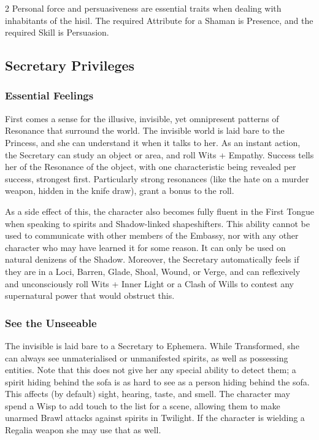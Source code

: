 \begin{multicols}{2}
Personal force and persuasiveness are essential traits when dealing with inhabitants of the hisil. The required Attribute for a Shaman is Presence, and the required Skill is Persuasion. 

\subsection*{Secretary Privileges}

\subsubsection*{Essential Feelings}

First comes a sense for the illusive, invisible, yet omnipresent patterns of Resonance that surround the world. The invisible world is laid bare to the Princess, and she can understand it when it talks to her. As an instant action, the Secretary can study an object or area, and roll Wits + Empathy. Success tells her of the Resonance of the object, with one characteristic being revealed per success, strongest first. Particularly strong resonances (like the hate on a murder weapon, hidden in the knife draw), grant a bonus to the roll.

As a side effect of this, the character also becomes fully fluent in the First Tongue when speaking to spirits and Shadow-linked shapeshifters. This ability cannot be used to communicate with other members of the Embassy, nor with any other character who may have learned it for some reason. It can only be used on natural denizens of the Shadow. Moreover, the Secretary automatically feels if they are in a Loci, Barren, Glade, Shoal, Wound, or Verge, and can reflexively and unconsciously roll Wits + Inner Light or a Clash of Wills to contest any supernatural power that would obstruct this. 
\subsubsection*{See the Unseeable}
The invisible is laid bare to a Secretary to Ephemera. While Transformed, she can always see unmaterialised or unmanifested spirits, as well as possessing entities. Note that this does not give her any special ability to detect them; a spirit hiding behind the sofa is as hard to see as a person hiding behind the sofa. This affects (by default) sight, hearing, taste, and smell. The character may spend a Wisp to add touch to the list for a scene, allowing them to make unarmed Brawl attacks against spirits in Twilight. If the character is wielding a Regalia weapon she may use that as well. 

\end{multicols}
